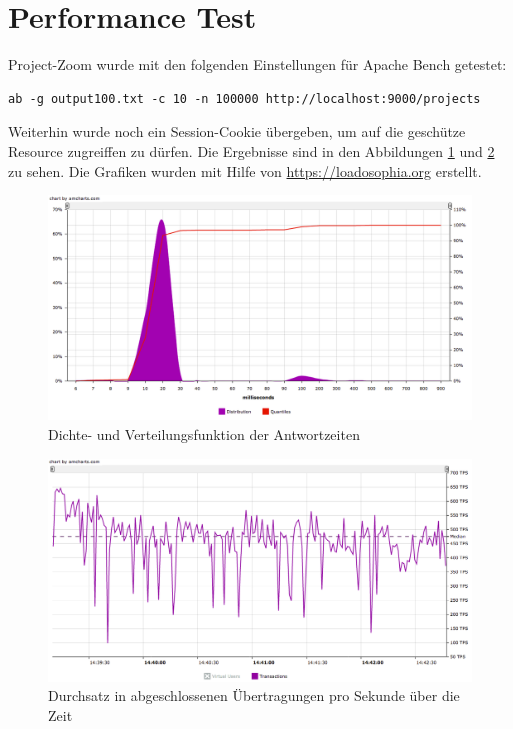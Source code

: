 \section{Performance Test}
\label{sec:performance-test}
Project-Zoom wurde mit den folgenden Einstellungen für Apache Bench getestet:
\begin{lstlisting}
ab -g output100.txt -c 10 -n 100000 http://localhost:9000/projects
\end{lstlisting}

Weiterhin wurde noch ein Session-Cookie übergeben, um auf die geschütze Resource zugreiffen zu dürfen. Die Ergebnisse sind in den Abbildungen \ref{fig:perf1} und \ref{fig:perf2} zu sehen. Die Grafiken wurden mit Hilfe von \url{https://loadosophia.org} erstellt.

\begin{figure}
  \centering     
  \includegraphics[width=1.0\textwidth]{img/perf1.png}  
   \caption{Dichte- und Verteilungsfunktion der Antwortzeiten }
  \label{fig:perf1} 
\end{figure}

\begin{figure}  
  \centering     
  \includegraphics[width=1.0\textwidth]{img/perf2.png}  
   \caption{Durchsatz in abgeschlossenen Übertragungen pro Sekunde über die Zeit}
  \label{fig:perf2} 
\end{figure}


